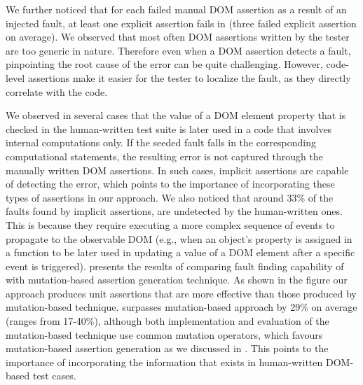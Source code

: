 We further noticed that for each failed manual DOM assertion as a result of an injected fault, at least one explicit assertion fails in \tool (three failed explicit assertion on average).
We observed that most often DOM assertions written by the tester are too generic in nature. Therefore even when a DOM assertion detects a \javascript fault, pinpointing the root cause of the error can be quite challenging. However, code-level assertions make it easier for the tester to localize the fault, as they directly correlate with the code.

We observed in several cases that the value of a DOM element property that is checked in the human-written test suite is later used in a \javascript code that involves internal computations only. If the seeded fault falls in the corresponding computational statements, the resulting error is not captured through the manually written DOM assertions. In such cases, implicit assertions are capable of detecting the error, which points to the importance of incorporating these types of assertions in our approach. We also noticed that around 33\% of the faults found by implicit assertions, are undetected by the human-written ones. This is because they require executing a more complex sequence of events to propagate to the observable DOM (e.g., when an object's property is assigned in a function to be later used in updating a value of a DOM element after a specific event is triggered).    
 presents the results of comparing fault finding capability of \tool with mutation-based assertion generation technique. As shown in the figure our approach produces unit assertions that are more effective than those produced by mutation-based technique. \tool surpasses mutation-based approach by 29\% on average (ranges from 17-40\%), although both implementation and evaluation of the mutation-based technique use common mutation operators, which favours mutation-based assertion generation as we discussed in . This points to the importance of incorporating the information that exists in human-written DOM-based test cases.       


